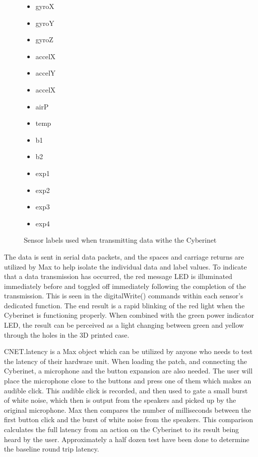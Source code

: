 \begin{figure}
    \centering
    \begin{itemize}
    \item gyroX
    \item gyroY
    \item gyroZ
    \item accelX
    \item accelY
    \item accelX
    \item airP
    \item temp
    \item b1
    \item b2
    \item exp1
    \item exp2
    \item exp3
    \item exp4
\end{itemize}
    \caption{Sensor labels used when transmitting data withe the Cyberinet}
    \label{fig:sensorLAbels}
\end{figure}

The data is sent in serial data packets, and the spaces and carriage returns are utilized by Max to help isolate the individual data and label values. To indicate that a data transmission has occurred, the red message LED is illuminated immediately before and toggled off immediately following the completion of the transmission. This is seen in the digitalWrite() commands within each sensor's dedicated function. The end result is a rapid blinking of the red light when the Cyberinet is functioning properly. When combined with the green power indicator LED, the result can be perceived as a light changing between green and yellow through the holes in the 3D printed case.  

CNET.latency is a Max object which can be utilized by anyone who needs to test the latency of their hardware unit. When loading the patch, and connecting the Cyberinet, a microphone and the button expansion are also needed. The user will place the microphone close to the buttons and press one of them which makes an audible click. This audible click is recorded, and then used to gate a small burst of white noise, which then is output from the speakers and picked up by the original microphone. Max then compares the number of milliseconds between the first button click and the burst of white noise from the speakers. This comparison calculates the full latency from an action on the Cyberinet to its result being heard by the user. Approximately a half dozen test have been done to determine the baseline round trip latency.

